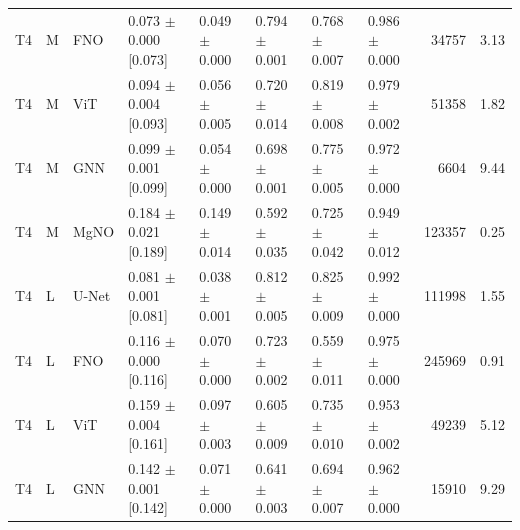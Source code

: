 \begin{table}[tb]
\begin{tabular}{llllllllrr}
T4 & M & FNO & 0.073 $\pm$ 0.000 [0.073] & 0.049 $\pm$ 0.000 & 0.794 $\pm$ 0.001 & 0.768 $\pm$ 0.007 & 0.986 $\pm$ 0.000 & 34757 & 3.13 \\
T4 & M & ViT & 0.094 $\pm$ 0.004 [0.093] & 0.056 $\pm$ 0.005 & 0.720 $\pm$ 0.014 & 0.819 $\pm$ 0.008 & 0.979 $\pm$ 0.002 & 51358 & 1.82 \\
T4 & M & GNN & 0.099 $\pm$ 0.001 [0.099] & 0.054 $\pm$ 0.000 & 0.698 $\pm$ 0.001 & 0.775 $\pm$ 0.005 & 0.972 $\pm$ 0.000 & 6604 & 9.44 \\
T4 & M & MgNO & 0.184 $\pm$ 0.021 [0.189] & 0.149 $\pm$ 0.014 & 0.592 $\pm$ 0.035 & 0.725 $\pm$ 0.042 & 0.949 $\pm$ 0.012 & 123357 & 0.25 \\
T4 & L & U-Net & 0.081 $\pm$ 0.001 [0.081] & 0.038 $\pm$ 0.001 & 0.812 $\pm$ 0.005 & 0.825 $\pm$ 0.009 & 0.992 $\pm$ 0.000 & 111998 & 1.55 \\
T4 & L & FNO & 0.116 $\pm$ 0.000 [0.116] & 0.070 $\pm$ 0.000 & 0.723 $\pm$ 0.002 & 0.559 $\pm$ 0.011 & 0.975 $\pm$ 0.000 & 245969 & 0.91 \\
T4 & L & ViT & 0.159 $\pm$ 0.004 [0.161] & 0.097 $\pm$ 0.003 & 0.605 $\pm$ 0.009 & 0.735 $\pm$ 0.010 & 0.953 $\pm$ 0.002 & 49239 & 5.12 \\
T4 & L & GNN & 0.142 $\pm$ 0.001 [0.142] & 0.071 $\pm$ 0.000 & 0.641 $\pm$ 0.003 & 0.694 $\pm$ 0.007 & 0.962 $\pm$ 0.000 & 15910 & 9.29 \\
\bottomrule
\end{tabular}
\end{table}
